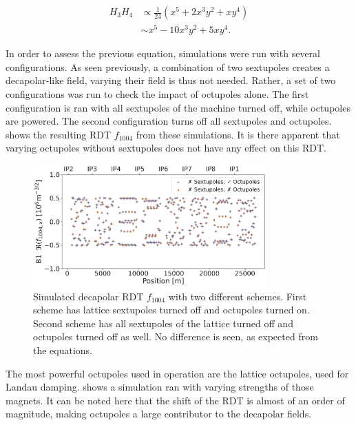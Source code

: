 \begin{equation}
    \begin{aligned}
         H_3 H_4 &\propto \frac{1}{24} \left(x^5 + 2x^3y^2 + xy^4 \right)\\
                   &\sim    x^5 - 10x^3y^2 + 5xy^4.
    \end{aligned}
    \label{eq:decapoles:sextupole_octupole_b5}
\end{equation}

In order to assess the previous equation, simulations were run with several configurations.
As seen previously, a combination of two sextupoles creates a decapolar-like field, varying their 
field is thus not needed. Rather, a set of two configurations was run to check the impact of 
octupoles alone. The first configuration is ran with all sextupoles of the machine
turned off, while octupoles are powered. The second configuration turns off all sextupoles and
octupoles.  shows the resulting RDT $f_{1004}$
from these simulations. It is there apparent that varying octupoles without sextupoles does not have 
any effect on this RDT.

\begin{figure}[!htb]
    \centering
    \includegraphics[width=0.8\textwidth]{./images/f1004/f1004_no_ms.pdf}
    \caption{Simulated decapolar RDT $f_{1004}$ with two different schemes. First scheme has
    lattice sextupoles turned off and octupoles turned on. Second scheme has all sextupoles of the
    lattice turned off and octupoles turned off as well. No difference is seen, as expected from
    the equations.}
    \label{fig:decapoles:rdts:sectupole_octupole_no_diff}
\end{figure}

The most powerful octupoles used in operation are the lattice octupoles, used for Landau damping.
 shows a simulation ran with varying strengths of
those magnets. It can be noted here that the shift of the RDT is almost of an order of magnitude,
making octupoles a large contributor to the decapolar fields.

